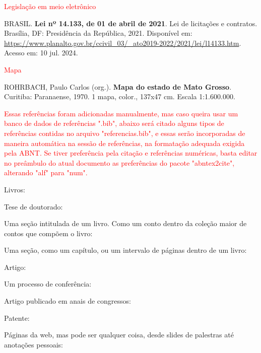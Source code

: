 \documentclass[
	12pt,				%
	openright,			%
	oneside,			%
	a4paper,			%
	english,			%
	french,				%
	spanish,			%
	brazil				%
	]{abntex2UFMT}
\begin{document}
\textcolor{red}{Legislação em meio eletrônico}
\begin{flushleft}
\begin{SingleSpace} 
BRASIL. \textbf{Lei nº 14.133, de 01 de abril de 2021}. Lei de licitações e contratos. Brasília, DF: Presidência da República, 2021. Disponível em: \url{https://www.planalto.gov.br/ccivil_03/_ato2019-2022/2021/lei/l14133.htm}. Acesso em: 10 jul. 2024. 
\end{SingleSpace}
\end{flushleft}

\textcolor{red}{Mapa}
\begin{flushleft}
\begin{SingleSpace} 
ROHRBACH, Paulo Carlos (org.). \textbf{Mapa do estado de Mato Grosso}. Curitiba: Paranaense, 1970. 1 mapa, color., 137x47 cm. Escala 1:1.600.000.
\end{SingleSpace}
\end{flushleft}

\textcolor{red}{Essas referências foram adicionadas manualmente, mas caso queira usar um banco de dados de referências ".bib", abaixo será citado alguns tipos de referências contidas no arquivo "referencias.bib", e essas serão incorporadas de maneira automática na sessão de referências, na formatação adequada exigida pela ABNT. Se tiver preferência pela citação e referências numéricas, basta editar no preâmbulo do atual documento as preferências do pacote "abntex2cite", alterando "alf"  para "num".}

Livros: \cite{gomes1998,FUNDAP1994,koogan1998,brasileira1939,geografico1943,paulista1941,michalany1981}

Tese de doutorado: \cite{barcelos1998}

Uma seção intitulada de um livro. Como um conto dentro da coleção maior de contos que compõem o livro: \cite{romano1996}

Uma seção, como um capítulo, ou um intervalo de páginas dentro de um livro: \cite{santos1994,priberam1998,secretaria1999}

Artigo: \cite{costa1998,fraipont1998}

Um processo de conferência: \cite{redes1995}

Artigo publicado em anais de congressos: \cite{martin1997}

Patente: \cite{cruvinel1989}

Páginas da web, mas pode ser qualquer coisa, desde slides de palestras até anotações pessoais: \cite{kobayashi1998,espaciais1987}
\end{document}
